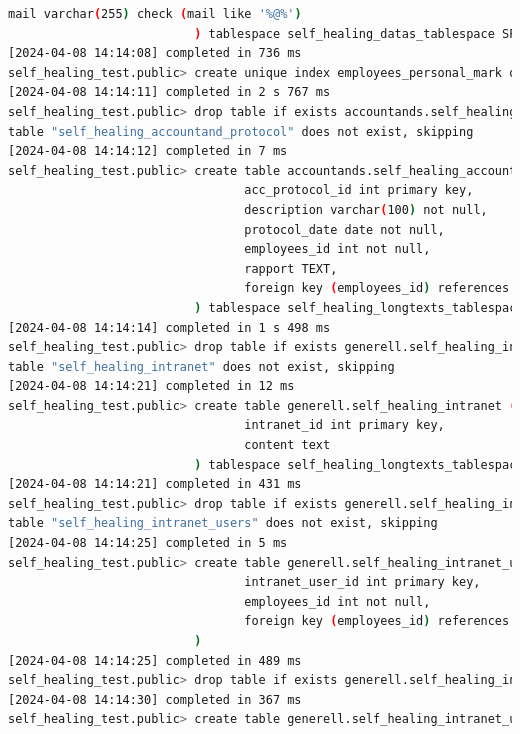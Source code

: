 \begin{flushleft}
\begin{lstlisting}[language=bash, caption=yugabyteDB - Evaluation-Testing,captionpos=b,label={lst:yugabytedb-evaluation-testing},breaklines=true]
                              mail varchar(255) check (mail like '%@%')
                          ) tablespace self_healing_datas_tablespace SPLIT INTO 3 TABLETS
[2024-04-08 14:14:08] completed in 736 ms
self_healing_test.public> create unique index employees_personal_mark on hrm.self_healing_employees(firstname, lastname, birthday) tablespace self_healing_indices_tablespace
[2024-04-08 14:14:11] completed in 2 s 767 ms
self_healing_test.public> drop table if exists accountands.self_healing_accountand_protocol
table "self_healing_accountand_protocol" does not exist, skipping
[2024-04-08 14:14:12] completed in 7 ms
self_healing_test.public> create table accountands.self_healing_accountand_protocol (
                                 acc_protocol_id int primary key,
                                 description varchar(100) not null,
                                 protocol_date date not null,
                                 employees_id int not null,
                                 rapport TEXT,
                                 foreign key (employees_id) references hrm.self_healing_employees(employees_id) on update restrict on delete restrict
                          ) tablespace self_healing_longtexts_tablespace SPLIT INTO 3 TABLETS
[2024-04-08 14:14:14] completed in 1 s 498 ms
self_healing_test.public> drop table if exists generell.self_healing_intranet
table "self_healing_intranet" does not exist, skipping
[2024-04-08 14:14:21] completed in 12 ms
self_healing_test.public> create table generell.self_healing_intranet (
                                 intranet_id int primary key,
                                 content text
                          ) tablespace self_healing_longtexts_tablespace SPLIT INTO 3 TABLETS
[2024-04-08 14:14:21] completed in 431 ms
self_healing_test.public> drop table if exists generell.self_healing_intranet_users
table "self_healing_intranet_users" does not exist, skipping
[2024-04-08 14:14:25] completed in 5 ms
self_healing_test.public> create table generell.self_healing_intranet_users (
                                 intranet_user_id int primary key,
                                 employees_id int not null,
                                 foreign key (employees_id) references hrm.self_healing_employees(employees_id) on update restrict on delete restrict
                          )
[2024-04-08 14:14:25] completed in 489 ms
self_healing_test.public> drop table if exists generell.self_healing_intranet_users
[2024-04-08 14:14:30] completed in 367 ms
self_healing_test.public> create table generell.self_healing_intranet_users (

\end{lstlisting}
\end{flushleft}
